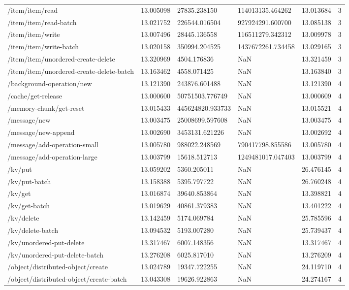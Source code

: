 \begin{tabularx}{\linewidth}{XXXXXX}
/item/item/read & 13.005098 & 27835.238150 & 114013135.464262 & 13.013684 & 3 \\
/item/item/read-batch & 13.021752 & 226544.016504 & 927924291.600700 & 13.085138 & 3 \\
/item/item/write & 13.007496 & 28445.136558 & 116511279.342312 & 13.009978 & 3 \\
/item/item/write-batch & 13.020158 & 350994.204525 & 1437672261.734458 & 13.029165 & 3 \\
/item/item/unordered-create-delete & 13.320969 & 4504.176836 & NaN & 13.321459 & 3 \\
/item/item/unordered-create-delete-batch & 13.163462 & 4558.071425 & NaN & 13.163840 & 3 \\
/background-operation/new & 13.121390 & 243876.601488 & NaN & 13.121390 & 4 \\
/cache/get-release & 13.000600 & 50751503.776749 & NaN & 13.000609 & 4 \\
/memory-chunk/get-reset & 13.015433 & 445624820.933733 & NaN & 13.015521 & 4 \\
/message/new & 13.003475 & 25008699.597608 & NaN & 13.003475 & 4 \\
/message/new-append & 13.002690 & 3453131.621226 & NaN & 13.002692 & 4 \\
/message/add-operation-small & 13.005780 & 988022.248569 & 790417798.855586 & 13.005780 & 4 \\
/message/add-operation-large & 13.003799 & 15618.512713 & 1249481017.047403 & 13.003799 & 4 \\
/kv/put & 13.059202 & 5360.205011 & NaN & 26.476145 & 4 \\
/kv/put-batch & 13.158388 & 5395.797722 & NaN & 26.760248 & 4 \\
/kv/get & 13.016874 & 39640.853864 & NaN & 13.398821 & 4 \\
/kv/get-batch & 13.019629 & 40861.379383 & NaN & 13.401222 & 4 \\
/kv/delete & 13.142459 & 5174.069784 & NaN & 25.785596 & 4 \\
/kv/delete-batch & 13.094532 & 5193.007280 & NaN & 25.739437 & 4 \\
/kv/unordered-put-delete & 13.317467 & 6007.148356 & NaN & 13.317467 & 4 \\
/kv/unordered-put-delete-batch & 13.276208 & 6025.817010 & NaN & 13.276209 & 4 \\
/object/distributed-object/create & 13.024789 & 19347.722255 & NaN & 24.119710 & 4 \\
/object/distributed-object/create-batch & 13.043308 & 19626.922863 & NaN & 24.274167 & 4 \\

\end{tabularx}
